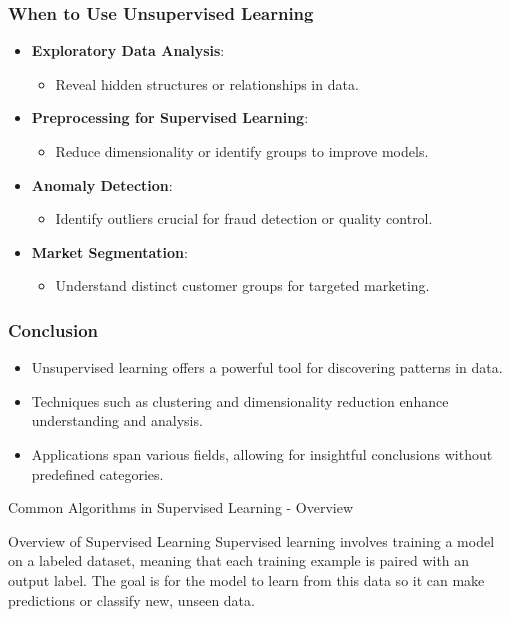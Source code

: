 \documentclass[aspectratio=169]{beamer}
\begin{document}
\begin{frame}[fragile]
    \frametitle{When to Use Unsupervised Learning}
    \begin{itemize}
        \item \textbf{Exploratory Data Analysis}:
        \begin{itemize}
            \item Reveal hidden structures or relationships in data.
        \end{itemize}
        \item \textbf{Preprocessing for Supervised Learning}:
        \begin{itemize}
            \item Reduce dimensionality or identify groups to improve models.
        \end{itemize}
        \item \textbf{Anomaly Detection}:
        \begin{itemize}
            \item Identify outliers crucial for fraud detection or quality control.
        \end{itemize}
        \item \textbf{Market Segmentation}:
        \begin{itemize}
            \item Understand distinct customer groups for targeted marketing.
        \end{itemize}
    \end{itemize}
\end{frame}

\begin{frame}[fragile]
    \frametitle{Conclusion}
    \begin{itemize}
        \item Unsupervised learning offers a powerful tool for discovering patterns in data.
        \item Techniques such as clustering and dimensionality reduction enhance understanding and analysis.
        \item Applications span various fields, allowing for insightful conclusions without predefined categories.
    \end{itemize}
\end{frame}

\begin{frame}[fragile]{Common Algorithms in Supervised Learning - Overview}
    \begin{block}{Overview of Supervised Learning}
        Supervised learning involves training a model on a labeled dataset, meaning that each training example is paired with an output label. The goal is for the model to learn from this data so it can make predictions or classify new, unseen data.
    \end{block}
\end{frame}
\end{document}
